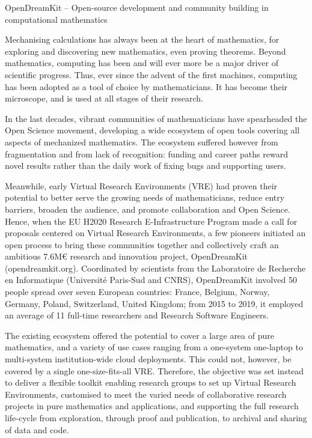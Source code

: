 OpenDreamKit – Open-source development and community building in computational mathematics

Mechanising calculations has always been at the heart of mathematics, for exploring and discovering new mathematics,
even proving theorems. Beyond mathematics, computing has been and will ever more be a major driver of scientific progress. 
Thus, ever since the advent of the first machines, computing has been adopted as a tool of choice by mathematicians. 
It has become their microscope, and is used at all stages of their research.

In the last decades, vibrant communities of mathematicians have spearheaded the Open Science movement, developing a 
wide ecosystem of open tools covering all aspects of mechanized mathematics. The ecosystem suffered however from 
fragmentation and from lack of recognition: funding and career paths reward novel results rather than the daily work 
of fixing bugs and supporting users.

Meanwhile, early Virtual Research Environments (VRE) had proven their potential to better serve the growing needs of
mathematicians, reduce entry barriers, broaden the audience, and promote collaboration and Open Science. Hence, when 
the EU H2020 Research E-Infrastructure Program made a call for proposals centered on Virtual Research Environments, a 
few pioneers initiated an open process to bring these communities together and collectively craft an ambitious 7.6M€ 
research and innovation project, OpenDreamKit (opendreamkit.org). Coordinated by scientists from the Laboratoire de 
Recherche en Informatique (Université Paris-Sud and CNRS), OpenDreamKit involved 50 people spread over seven European
 countries: France, Belgium, Norway, Germany, Poland, Switzerland, United Kingdom; from 2015 to 2019, it employed an 
average of 11 full-time researchers and Research Software Engineers.

The existing ecosystem offered the potential to cover a large area of pure mathematics, and a variety of use cases 
ranging from a one-system one-laptop to multi-system institution-wide cloud deployments. This could not, however, 
be covered by a single one-size-fits-all VRE. Therefore, the objective was set instead to deliver a flexible toolkit
enabling research groups to set up Virtual Research Environments, customised to meet the varied needs of collaborative 
research projects in pure mathematics and applications, and supporting the full research life-cycle from exploration, 
through proof and publication, to archival and sharing of data and code.


